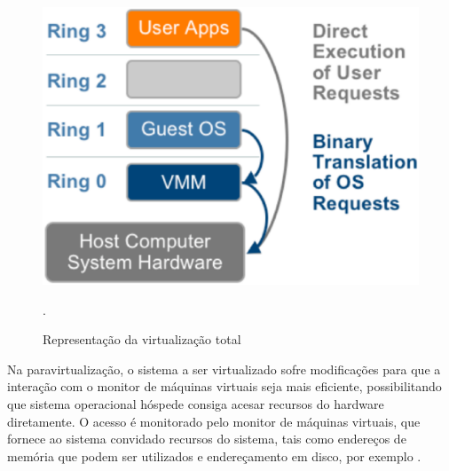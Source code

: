 \begin{figure}[!htb]
\centering
\includegraphics [keepaspectratio=true,scale=0.40]{figuras/full_virtualization_2.eps}
\caption{Representação da virtualização total}
\cite{vmware}.
\label{full_virtualization}
\end{figure}

Na paravirtualização, o sistema a ser virtualizado sofre modificações para que a interação com o monitor de máquinas virtuais seja mais eficiente, possibilitando que sistema operacional hóspede consiga acesar recursos do hardware diretamente. O acesso é monitorado pelo monitor de máquinas virtuais, que fornece ao sistema convidado recursos do sistema, tais como endereços de memória que podem ser utilizados e endereçamento em disco, por exemplo \cite{marcos}.

